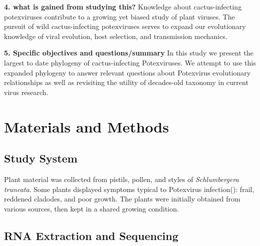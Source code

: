 \documentclass{article}
\begin{document}
\textbf{4. what is gained from studying this?} 
Knowledge about cactus-infecting potexviruses contribute to a growing yet biased study of plant viruses. 
The pursuit of wild cactus-infecting potexviruses serves to expand our evolutionary knowledge of viral evolution, host selection, and transmission mechanics. 


\textbf{5. Specific objectives and questions/summary}
In this study we present the largest to date phylogeny of cactus-infecting Potexviruses. 
We attempt to use this expanded phylogeny to answer relevant questions about Potexvirus evolutionary relationships as well as revisiting the utility of decades-old taxonomy in current virus research. 

\section*{Materials and Methods}

\subsection{Study System}

Plant material was collected from pistils, pollen, and styles of \textit{Schlumbergera truncata}.
Some plants displayed symptoms typical to Potexvirus infection(\cite{chessin_distribution_1972}): frail, reddened cladodes, and poor growth.  
The plants were initially obtained from various sources, then kept in a shared growing condition. 

\subsection{RNA Extraction and Sequencing} 
\end{document}
